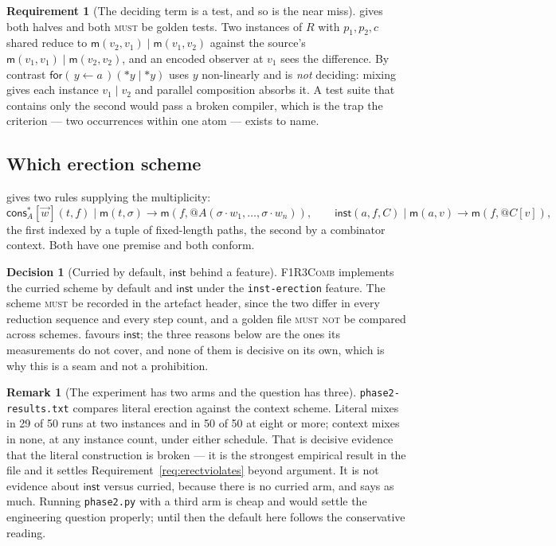\documentclass[11pt,a4paper]{article}
\makeatletter
\newcommand{\code}[1]{\texttt{#1}}
\newcommand{\Comb}{\textsc{F1R3Comb}}
\newcommand{\MUST}{\textsc{must}}
\newcommand{\MUSTNOT}{\textsc{must not}}
\newcommand{\quo}[1]{@#1}
\newcommand{\drp}[1]{{*}#1}
\newcommand{\inp}[3]{\mathsf{for}(\,#1 \leftarrow #2\,)#3}
\newcommand{\mm}{\mathsf{m}}
\newcommand{\cons}{\mathsf{cons}}
\newcommand{\red}{\longrightarrow}
\newcommand{\inst}{\mathsf{inst}}
\theoremstyle{definition}
\newtheorem{requirement}[definition]{Requirement}
\newtheorem{decision}[definition]{Decision}
\newtheorem{remark}[definition]{Remark}
\theoremstyle{plain}
\makeatother
\begin{document}
\begin{requirement}[The deciding term is a test, and so is the near miss]
\label{req:deciding}
\cite[Ex.~6.21]{draft3} gives both halves and both \MUST{} be golden tests.
Two instances of $R$ with $p_{1},p_{2},c$ shared reduce to
$\mm(v_{2},v_{1}) \mid \mm(v_{1},v_{2})$ against the source's
$\mm(v_{1},v_{1}) \mid \mm(v_{2},v_{2})$, and an encoded observer at $v_{1}$
sees the difference. By contrast $\inp{y}{a}{(\drp{y} \mid \drp{y})}$ uses $y$
non-linearly and is \emph{not} deciding: mixing gives each instance
$v_{1} \mid v_{2}$ and parallel composition absorbs it. A test suite that
contains only the second would pass a broken compiler, which is the trap the
criterion --- two occurrences within one atom --- exists to name.
\end{requirement}

\subsection{Which erection scheme}\label{sec:schemes}

\cite[\S6.7]{draft3} gives two rules supplying the multiplicity:
\[
  \cons^{*}_{A}[\vec w](t,f) \mid \mm(t,\sigma) \red
  \mm(f, \quo{A(\sigma\!\cdot\!w_{1},\dots,\sigma\!\cdot\!w_{n})}),
  \qquad
  \inst(a,f,C) \mid \mm(a,v) \red \mm(f,\quo{C[v]}),
\]
\[
\]
the first indexed by a tuple of fixed-length paths, the second by a combinator
context. Both have one premise and both conform.

\begin{decision}[Curried by default, $\inst$ behind a feature]
\label{dec:scheme}
\Comb{} implements the curried scheme by default and $\inst$ under the
\code{inst-erection} feature. The scheme \MUST{} be recorded in the artefact
header, since the two differ in every reduction sequence and every step count,
and a golden file \MUSTNOT{} be compared across schemes.
\cite[Rem.~6.22]{draft3} favours $\inst$; the three reasons below are the ones
its measurements do not cover, and none of them is decisive on its own, which
is why this is a seam and not a prohibition.
\end{decision}

\begin{remark}[The experiment has two arms and the question has three]
\label{rem:thirdarm}
\code{phase2-results.txt} compares literal erection against the context
scheme. Literal mixes in 29 of 50 runs at two instances and in 50 of 50 at
eight or more; context mixes in none, at any instance count, under either
schedule. That is decisive evidence that the literal construction is broken
--- it is the strongest empirical result in the file and it settles
Requirement~\ref{req:erectviolates} beyond argument. It is not evidence about
$\inst$ versus curried, because there is no curried arm, and
\cite[Rem.~6.22]{draft3} says as much. Running \code{phase2.py} with a third
arm is cheap and would settle the engineering question properly; until then
the default here follows the conservative reading.
\end{remark}
\end{document}

